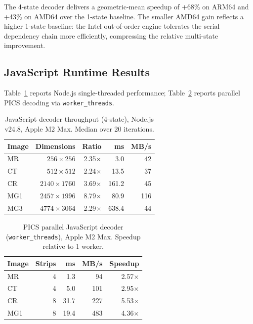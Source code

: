 \documentclass[journal]{IEEEtran}
\begin{document}
The 4-state decoder delivers a geometric-mean speedup of $+$68\% on ARM64 and
$+$43\% on AMD64 over the 1-state baseline. The smaller AMD64 gain reflects
a higher 1-state baseline: the Intel out-of-order engine tolerates the serial
dependency chain more efficiently, compressing the relative multi-state
improvement.

\subsection{JavaScript Runtime Results}

Table~\ref{tab:js-perf} reports Node.js single-threaded performance;
Table~\ref{tab:pics-js} reports parallel PICS decoding via
\texttt{worker\_threads}.

\begin{table}[htbp]
\centering
\caption{JavaScript decoder throughput (4-state), Node.js v24.8, Apple M2 Max.
Median over 20 iterations.}
\label{tab:js-perf}
\begin{tabular}{lrrrr}
\toprule
Image & Dimensions & Ratio & ms & MB/s \\
\midrule
MR  & $256{\times}256$ & 2.35$\times$ & 3.0 & 42 \\
CT  & $512{\times}512$ & 2.24$\times$ & 13.5 & 37 \\
CR  & $2140{\times}1760$ & 3.69$\times$ & 161.2 & 45 \\
MG1 & $2457{\times}1996$ & 8.79$\times$ & 80.9 & 116 \\
MG3 & $4774{\times}3064$ & 2.29$\times$ & 638.4 & 44 \\
\bottomrule
\end{tabular}
\end{table}

\begin{table}[htbp]
\centering
\caption{PICS parallel JavaScript decoder (\texttt{worker\_threads}), Apple M2
Max. Speedup relative to 1 worker.}
\label{tab:pics-js}
\begin{tabular}{lrrrr}
\toprule
Image & Strips & ms & MB/s & Speedup \\
\midrule
MR  & 4 & 1.3 & 94 & 2.57$\times$ \\
CT  & 4 & 5.0 & 101 & 2.95$\times$ \\
CR  & 8 & 31.7 & 227 & 5.53$\times$ \\
MG1 & 8 & 19.4 & 483 & 4.36$\times$ \\
\bottomrule
\end{tabular}
\end{table}
\end{document}
